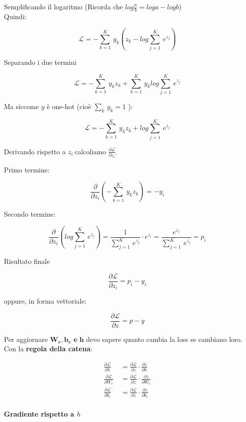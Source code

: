 \documentclass[
  11pt,
]{article}
\begin{document}
Semplificando il logaritmo (Ricorda che
\(log\frac{a}{b} = loga - logb\))\\
Quindi:


\[\mathcal{L} = - \sum_{k = 1}^{K}\, y_{k}\left( z_{k} - log\sum_{j = 1}^{K}\, e^{z_{j}} \right)\]


Separando i due termini


\[\mathcal{L} = - \sum_{k = 1}^{K}\, y_{k}z_{k} + \sum_{k = 1}^{K}\, y_{k}log\sum_{j = 1}^{K}\, e^{z_{j}}\]

Ma siccome \(y\) è one-hot (cioè \(\sum_{k}^{}\, y_{k} = 1\)
):

\[\mathcal{L} = - \sum_{k = 1}^{K}\, y_{k}z_{k} + log\sum_{j = 1}^{K}\, e^{z_{j}}\]


Derivando rispetto a \(z_{i}\ \)calcoliamo
\(\frac{\partial\mathcal{L}}{\partial z_{i}}\).


Primo termine:


\[\frac{\partial}{\partial z_{i}}\left( - \sum_{k = 1}^{K}\, y_{k}z_{k} \right) = - y_{i}\]


Secondo termine:

\[\frac{\partial}{\partial z_{i}}\left( log\sum_{j = 1}^{K}\, e^{z_{j}} \right) = \frac{1}{\sum_{j = 1}^{K}\, e^{z_{j}}} \cdot e^{z_{i}} = \frac{e^{z_{i}}}{\sum_{j = 1}^{K}\, e^{z_{j}}} = p_{i}\]

Risultato finale

\[\frac{\partial\mathcal{L}}{\partial z_{i}} = p_{i} - y_{i}\]

oppure, in forma vettoriale:

\[\frac{\partial\mathcal{L}}{\partial z} = p - y\]

Per aggiornare
\(\mathbf{W}_{\mathbf{c}}\mathbf{,}\mathbf{b}_{\mathbf{c}}\) \textbf{e}
\(\mathbf{h}\) devo sapere quanto cambia la loss se cambiano loro.\\
Con la \textbf{regola della catena}:

\[\begin{matrix}
\frac{\partial\mathcal{L}}{\partial h} & \  = \frac{\partial\mathcal{L}}{\partial z} \cdot \frac{\partial z}{\partial h} \\
\frac{\partial\mathcal{L}}{\partial W_{c}} & \  = \frac{\partial\mathcal{L}}{\partial z} \cdot \frac{\partial z}{\partial W_{c}} \\
\frac{\partial\mathcal{L}}{\partial b_{c}} & \  = \frac{\partial\mathcal{L}}{\partial z} \cdot \frac{\partial z}{\partial b_{c}}
\end{matrix}\]

\paragraph{Gradiente rispetto a $h$}
\end{document}

